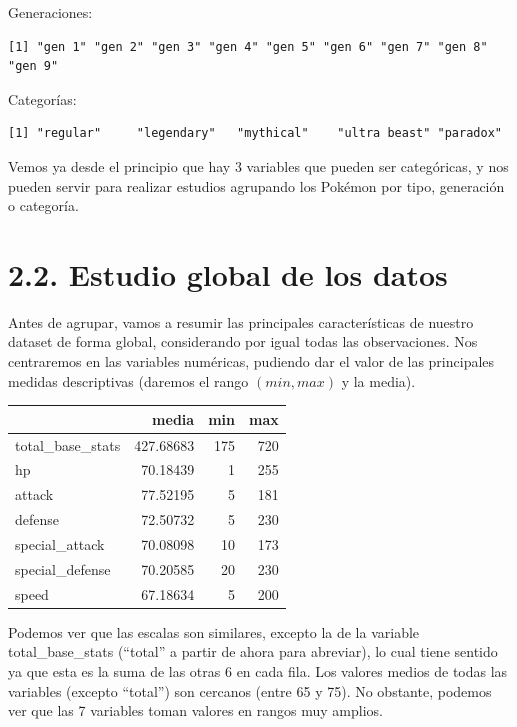 \documentclass[
  11.8pt,
]{extreport}
\begin{document}
Generaciones:

\begin{verbatim}
[1] "gen 1" "gen 2" "gen 3" "gen 4" "gen 5" "gen 6" "gen 7" "gen 8" "gen 9"
\end{verbatim}

Categorías:

\begin{verbatim}
[1] "regular"     "legendary"   "mythical"    "ultra beast" "paradox"    
\end{verbatim}

Vemos ya desde el principio que hay 3 variables que pueden ser
categóricas, y nos pueden servir para realizar estudios agrupando los
Pokémon por tipo, generación o categoría.

\section{2.2. Estudio global de los
datos}\label{estudio-global-de-los-datos}

Antes de agrupar, vamos a resumir las principales características de
nuestro dataset de forma global, considerando por igual todas las
observaciones. Nos centraremos en las variables numéricas, pudiendo dar
el valor de las principales medidas descriptivas (daremos el rango
\((min, max)\) y la media).

\begin{table}[H]
\centering
\begin{tabular}{lrrr}
\toprule
  & media & min & max\\
\midrule
total\_base\_stats & 427.68683 & 175 & 720\\
hp & 70.18439 & 1 & 255\\
attack & 77.52195 & 5 & 181\\
defense & 72.50732 & 5 & 230\\
special\_attack & 70.08098 & 10 & 173\\
\addlinespace
special\_defense & 70.20585 & 20 & 230\\
speed & 67.18634 & 5 & 200\\
\bottomrule
\end{tabular}
\end{table}

Podemos ver que las escalas son similares, excepto la de la variable
total\_base\_stats (``total'' a partir de ahora para abreviar), lo cual
tiene sentido ya que esta es la suma de las otras 6 en cada fila. Los
valores medios de todas las variables (excepto ``total'') son cercanos
(entre 65 y 75). No obstante, podemos ver que las 7 variables toman
valores en rangos muy amplios.
\end{document}
